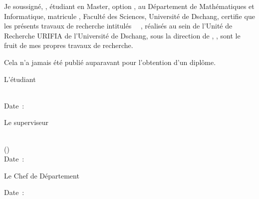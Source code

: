 
Je soussign\'e, \textbf{\thesisAuthor}, \'etudiant en Master, option \thesisSpecialization, au D\'epartement de Math\'ematiques et Informatique, matricule \textbf{\thesisMatricule}, Facult\'e des Sciences, Universit\'e de Dschang, certifie que les pr\'esents travaux de recherche intitul\'es \guillemotleft~\thesisTitleFrShort~\guillemotright, r\'ealis\'es au sein de l'Unit\'e de Recherche URIFIA de l'Universit\'e de Dschang, sous la direction de \textbf{\thesisSupervisor}, \thesisSupervisorTitle, sont le fruit de mes propres travaux de recherche.

Cela n'a jamais \'et\'e publi\'e auparavant pour l'obtention d'un dipl\^ome.

\vspace{1.5em}
\begin{center}
    
L'\'etudiant\\
\vspace{3em}

\textbf{\thesisAuthor} \\
Date~: \underline{\hspace{3cm}} 

\vspace{2em}
Le superviseur\\
\vspace{3em}

\textbf{\thesisSupervisor}\\
(\thesisSupervisorTitle)\\
Date~: \underline{\hspace{3cm}}

\vspace{2em}
Le Chef de D\'epartement\\
\vspace{3em}

Date~: \underline{\hspace{3cm}}



\end{center}

\myCleanStarChapterEnd
